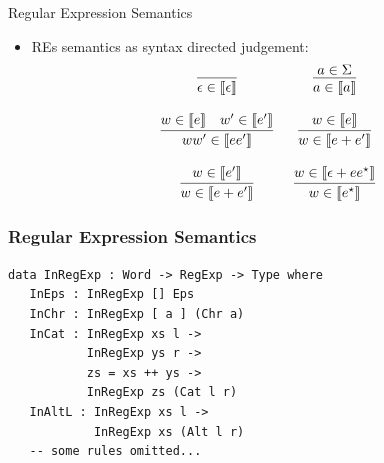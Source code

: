 \documentclass[14pt]{beamer}
\newcommand{\sembrack}[1]{\ensuremath{\llbracket #1 \rrbracket}}
\begin{document}
     \begin{frame}{Regular Expression Semantics}
        \begin{itemize}
           \item REs semantics as syntax directed judgement:
           \[
              \begin{array}{cc}
                 \infer[]{\epsilon \in \sembrack{\epsilon}}{} &
                 \infer[]{a \in \sembrack{a}}{a \in \Sigma} \\ \\
                 \infer[]{ww' \in \sembrack{ee'}}
                         {w \in \sembrack{e} & w' \in \sembrack{e'}} &
                 \infer[]{w \in \sembrack{e + e'}}{w\in\sembrack{e}}\\ \\
                 \infer[]{w \in \sembrack{e + e'}}{w\in\sembrack{e'}} &
                 \infer[]{w\in \sembrack{e^{\star}}}
                         {w\in\sembrack{\epsilon + ee^{\star}}}
              \end{array}
           \]
        \end{itemize}
     \end{frame}
     \begin{frame}[fragile=singleslide]
        \frametitle{Regular Expression Semantics}
        \begin{verbatim}
data InRegExp : Word -> RegExp -> Type where
   InEps : InRegExp [] Eps
   InChr : InRegExp [ a ] (Chr a)
   InCat : InRegExp xs l ->
           InRegExp ys r ->
           zs = xs ++ ys ->
           InRegExp zs (Cat l r)
   InAltL : InRegExp xs l ->
            InRegExp xs (Alt l r)
   -- some rules omitted...
        \end{verbatim}
     \end{frame}
\end{document}
